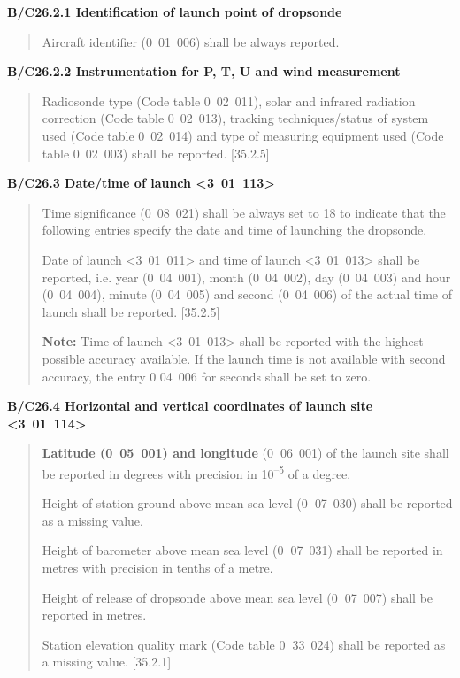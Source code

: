 \textbf{B/C26.2.1 Identification of launch point of dropsonde}

\begin{quote}
Aircraft identifier (0~01~006) shall be always reported.
\end{quote}

\textbf{B/C26.2.2 Instrumentation for P, T, U and wind measurement}

\begin{quote}
Radiosonde type (Code table 0~02~011), solar and infrared radiation correction (Code table 0~02~013), tracking techniques/status of system used (Code table 0~02~014) and type of measuring equipment used (Code table 0~02~003) shall be reported. {[}35.2.5{]}
\end{quote}

\textbf{B/C26.3 Date/time of launch \textless3~01~113\textgreater{}}

\begin{quote}
Time significance (0~08~021) shall be always set to 18 to indicate that the following entries specify the date and time of launching the dropsonde.

Date of launch \textless3~01~011\textgreater{} and time of launch \textless3~01~013\textgreater{} shall be reported, i.e. year (0~04~001), month (0~04~002), day (0~04~003) and hour (0~04~004), minute (0~04~005) and second (0~04~006) of the actual time of launch shall be reported. {[}35.2.5{]}

\textbf{Note:} Time of launch \textless3~01~013\textgreater{} shall be reported with the highest possible accuracy available. If the launch time is not available with second accuracy, the entry 0 04~006 for seconds shall be set to zero.
\end{quote}

\textbf{B/C26.4 Horizontal and vertical coordinates of launch site \textless3~01~114\textgreater{}}

\begin{quote}
\textbf{Latitude (0~05~001) and longitude} (0\textbf{~}06~001) of the launch site shall be reported in degrees with precision in 10\textsuperscript{--5} of a degree.

Height of station ground above mean sea level (0\textbf{~}07~030) shall be reported as a missing value.

Height of barometer above mean sea level (0\textbf{~}07~031) shall be reported in metres with precision in tenths of a metre.

Height of release of dropsonde above mean sea level (0\textbf{~}07~007) shall be reported in metres.

Station elevation quality mark (Code table 0\textbf{~}33~024) shall be reported as a missing value. {[}35.2.1{]}
\end{quote}

